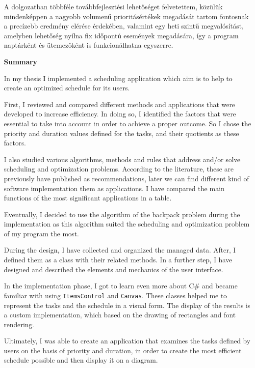 A dolgozatban többféle továbbfejlesztési lehetőséget felvetettem, közülük mindenképpen a nagyobb volumenű prioritásértékek megadását tartom fontosnak a precízebb eredmény elérése érdekében, valamint egy heti szintű megvalósítást, amelyben lehetőség nyílna fix időpontú események megadására, így a program naptárként és ütemezőként is funkcionálhatna egyszerre.

\newpage
\begin{LARGE}
\textbf{Summary}
\end{LARGE}
\vskip 1cm

In my thesis I implemented a scheduling application which aim is to help to create an optimized schedule for its users.

First, I reviewed and compared different methods and applications that were developed to increase efficiency. In doing so, I identified the factors that were essential to take into account in order to achieve a proper outcome. So I chose the priority and duration values defined for the tasks, and their quotients as these factors.

I also studied various algorithms, methods and rules that address and/or solve scheduling and optimization problems. According to the literature, these are previously have published as recommendations, later we can find different kind of software implementation them as applications.
I have compared the main functions of the most significant applications in a table.

Eventually, I decided to use the algorithm of the backpack problem during the implementation as this algorithm suited the scheduling and optimization problem of my program the most.

During the design, I have collected and organized the managed data. After, I defined them as a class with their related methods. In a further step, I have designed and described the elements and mechanics of the user interface.

In the implementation phase, I got to learn even more about C\# and became familiar with using \texttt{ItemsControl} and \texttt{Canvas}. These classes helped me to represent the tasks and the schedule in a visual form.
The display of the results is a custom implementation, which based on the drawing of rectangles and font rendering.

Ultimately, I was able to create an application that examines the tasks defined by users on the basis of priority and duration, in order to create the most efficient schedule possible and then display it on a diagram.

